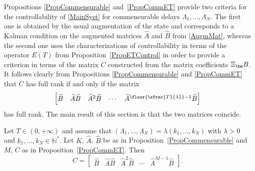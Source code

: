 Propositions \ref{PropCommensurable} and~\ref{PropCommET} provide two criteria for the controllability of \eqref{MainSyst} for commensurable delays $\Lambda_1, \dots, \Lambda_N$. The first one is obtained by the usual augmentation of the state and corresponds to a Kalman condition on the augmented matrices $\widehat A$ and $\widehat B$ from \eqref{AugmMat}, whereas the second one uses the characterizations of controllability in terms of the operator $E(T)$ from Proposition~\ref{PropETControl} in order to provide a criterion in terms of the matrix $C$ constructed from the matrix coefficients $\Xi_{\bn} B$. It follows clearly from Propositions \ref{PropCommensurable} and \ref{PropCommET} that $C$ has full rank if and only if the matrix
\[
\begin{bmatrix}
\widehat B & \widehat A \widehat B & \widehat A^2 \widehat B & \cdots & \widehat A^{\floor{\sfrac{T}{\lambda}}-1} \widehat B
\end{bmatrix}
\]
has full rank. The main result of this section is that the two matrices coincide.

\begin{theo}
\label{TheoCommens}
Let $T \in (0, +\infty)$ and assume that $(\Lambda_1, \dots, \Lambda_N) = \lambda (k_1, \dots, k_N)$ with $\lambda > 0$ and $k_1, \dots,  k_N \in \mathbb N^\ast$. Let $K$, $\widehat A$, $\widehat B$ be as in Proposition~\ref{PropCommensurable} and $M$, $C$ as in Proposition~\ref{PropCommET}. Then
\[C = \begin{bmatrix}\widehat B & \widehat A \widehat B & \widehat A^2 \widehat B & \cdots & \widehat A^{M-1} \widehat B\end{bmatrix}.\]
\end{theo}

